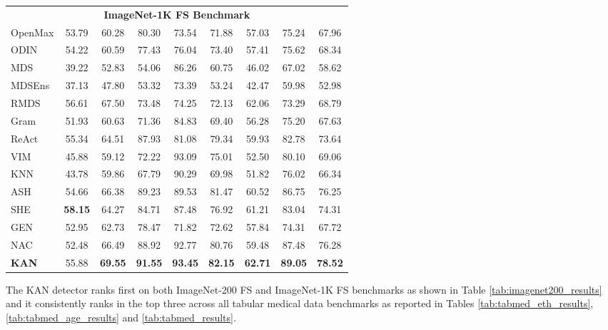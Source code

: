 \begin{table}[ht]
\begin{center}
{\begin{tabular}{lcccccccc}
\midrule
\multicolumn{9}{c}{\textbf{ImageNet-1K FS Benchmark}} \\
OpenMax	    &   53.79  &	60.28   &	80.30   &	73.54   &	71.88   &    57.03  &	75.24   &   67.96   \\     
ODIN	    &   54.22  &	60.59   &	77.43   &	76.04   &	73.40   &    57.41  &	75.62   &   68.34   \\   
MDS	        &   39.22  &	52.83   &	54.06   &	86.26   &	60.75   &    46.02  &	67.02   &   58.62   \\   
MDSEns	    &   37.13  &	47.80   &	53.32   &	73.39   &	53.24   &    42.47  &	59.98   &   52.98   \\   
RMDS	    &   56.61  &	67.50   &	73.48   &	74.25   &	72.13   &    62.06  &	73.29   &   68.79   \\   
Gram	    &   51.93  &	60.63   &	71.36   &	84.83   &	69.40   &    56.28  &	75.20   &   67.63   \\     
ReAct	    &   55.34  &	64.51   &	87.93   &	81.08   &	79.34   &    59.93  &	82.78   &   73.64   \\   
VIM	        &   45.88  &	59.12   &	72.22   &	93.09   &	75.01   &    52.50  &	80.10   &   69.06   \\   
KNN	        &   43.78  &	59.86   &	67.79   &	90.29   &	69.98   &    51.82  &	76.02   &   66.34   \\   
ASH	        &   54.66  &	66.38   &	89.23   &	89.53   &	81.47   &    60.52  &	86.75   &   76.25   \\   
SHE	        &   \textbf{58.15}  &	64.27   &	84.71   &	87.48   &	76.92   &    61.21  &	83.04   &   74.31   \\   
GEN	        &   52.95  &	62.73   &	78.47   &	71.82   &	72.62   &    57.84  &	74.31   &   67.72   \\ 
NAC         &   52.48  &	66.49   &	88.92   &	92.77   &	80.76   &    59.48  &   87.48   &   76.28   \\ 
\rowcolor[HTML]{E7E6E6}
\textbf{KAN}	        & 55.88	    & \textbf{69.55}	    & \textbf{91.55}	    & \textbf{93.45}	    & \textbf{82.15}	    & \textbf{62.71}	    & \textbf{89.05}	    & \textbf{78.52} \\
\bottomrule
\end{tabular}
}
\end{center}
\end{table}

The KAN detector ranks first on both ImageNet-200 FS and ImageNet-1K FS benchmarks as shown in Table \ref{tab:imagenet200_results} and it consistently ranks in the top three across all tabular medical data benchmarks as reported in Tables \ref{tab:tabmed_eth_results}, \ref{tab:tabmed_age_results} and \ref{tab:tabmed_results}.

